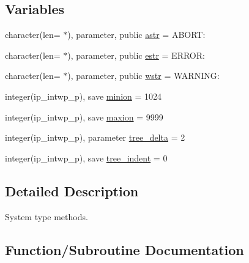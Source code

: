 \subsection*{Variables}
\begin{DoxyCompactItemize}
\item 
character(len= $\ast$), parameter, public \hyperlink{namespacemod__oasis__sys_aad26202d309c5b33de4cddb54c7edc99}{astr} = \textquotesingle{} A\+B\+O\+R\+T\+: \textquotesingle{}
\item 
character(len= $\ast$), parameter, public \hyperlink{namespacemod__oasis__sys_a0f6e0376585c6f39d653f5ab05e80e8f}{estr} = \textquotesingle{} E\+R\+R\+O\+R\+: \textquotesingle{}
\item 
character(len= $\ast$), parameter, public \hyperlink{namespacemod__oasis__sys_a4e16ba69c68a3a39c8b8aa3b92234ce1}{wstr} = \textquotesingle{} W\+A\+R\+N\+I\+N\+G\+: \textquotesingle{}
\item 
integer(ip\+\_\+intwp\+\_\+p), save \hyperlink{namespacemod__oasis__sys_aded42e42797afa8d6ee5bdefdf42a812}{minion} = 1024
\item 
integer(ip\+\_\+intwp\+\_\+p), save \hyperlink{namespacemod__oasis__sys_a9dc0e2d10d9e8e8c23e391467ae2eee4}{maxion} = 9999
\item 
integer(ip\+\_\+intwp\+\_\+p), parameter \hyperlink{namespacemod__oasis__sys_ad7e3af62b75730bc71be0df8ae50cf0a}{tree\+\_\+delta} = 2
\item 
integer(ip\+\_\+intwp\+\_\+p), save \hyperlink{namespacemod__oasis__sys_a159b60d106efcb1f42722b08c5511ad0}{tree\+\_\+indent} = 0
\end{DoxyCompactItemize}


\subsection{Detailed Description}
System type methods. 

\subsection{Function/\+Subroutine Documentation}
\mbox{\label{namespacemod__oasis__sys_af1943a0ce0c5765ba8a714379065464f}} 
